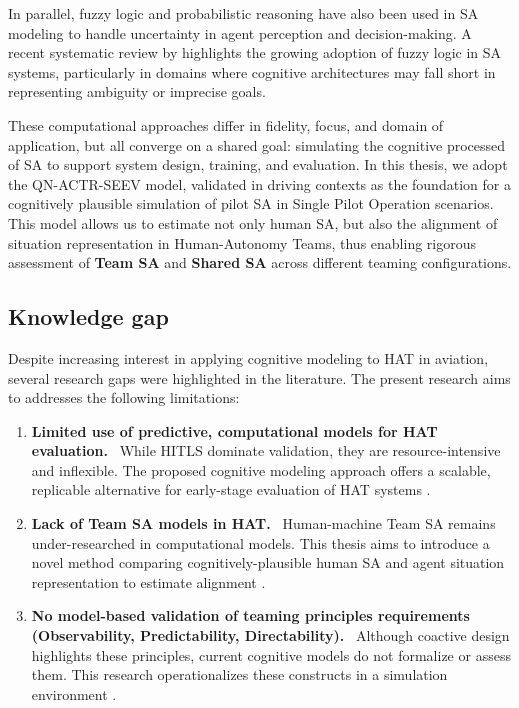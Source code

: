 \documentclass[12pt,a4paper]{article} %
\begin{document}
	In parallel, fuzzy logic and probabilistic reasoning have also been used in SA modeling to handle uncertainty in agent perception and decision-making. A recent systematic review by \textcite{daniello_fuzzy_2023} highlights the growing adoption of fuzzy logic in SA systems, particularly in domains where cognitive architectures may fall short in representing ambiguity or imprecise goals.

	These computational approaches differ in fidelity, focus, and domain of application, but all converge on a shared goal: simulating the cognitive processed of SA to support system design, training, and evaluation. In this thesis, we adopt the QN-ACTR-SEEV model, validated in driving contexts as the foundation for a cognitively plausible simulation of pilot SA in Single Pilot Operation scenarios. This model allows us to estimate not only human SA, but also the alignment of situation representation in Human-Autonomy Teams, thus enabling rigorous assessment of \textbf{Team SA} and \textbf{Shared SA} across different teaming configurations.

	\subsection{Knowledge gap}
	Despite increasing interest in applying cognitive modeling to HAT in aviation, several research gaps were highlighted in the literature. The present research aims to addresses the following limitations:

	\begin{enumerate}
		\item \textbf{Limited use of predictive, computational models for HAT evaluation.} \
		While HITLS dominate validation, they are resource-intensive and inflexible. The proposed cognitive modeling approach offers a scalable, replicable alternative for early-stage evaluation of HAT systems \parencite{kaber_conceptual_2018,national_academies_of_sciences_engineering_and_medicine_human-ai_2022}.

		\item \textbf{Lack of Team SA models in HAT.} \
		Human-machine Team SA remains under-researched in computational models. This thesis aims to introduce a novel method comparing cognitively-plausible human SA and agent situation representation to estimate alignment \parencite{cooke_teams_2024,freiman_assessing_2019}.

		\item \textbf{No model-based validation of teaming principles requirements (Observability, Predictability, Directability).} \
		Although coactive design highlights these principles, current cognitive models do not formalize or assess them. This research operationalizes these constructs in a simulation environment \parencite{johnson_coactive_2014,stensrud_exploring_2024}.
	\end{enumerate}
\end{document}
